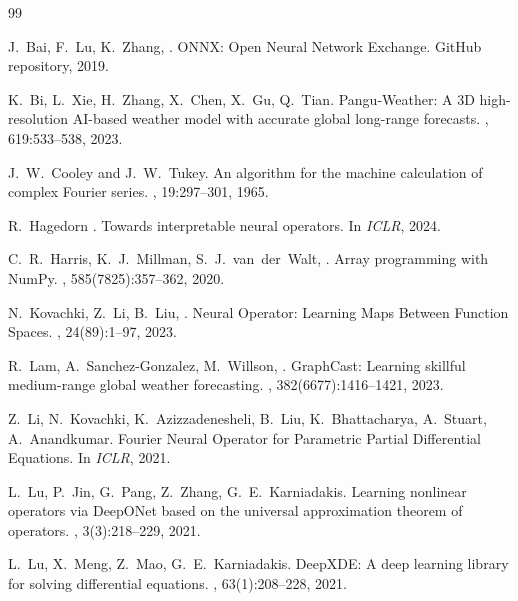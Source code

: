 \documentclass[10pt,twocolumn]{article}
\begin{document}
\begin{thebibliography}{99}\small
\setlength{\itemsep}{2pt}

J.~Bai, F.~Lu, K.~Zhang, \etal.
\newblock ONNX: Open Neural Network Exchange.
\newblock GitHub repository, 2019.

K.~Bi, L.~Xie, H.~Zhang, X.~Chen, X.~Gu, Q.~Tian.
\newblock Pangu-Weather: A 3D high-resolution AI-based weather model
with accurate global long-range forecasts.
, 619:533--538, 2023.

J.~W.~Cooley and J.~W.~Tukey.
\newblock An algorithm for the machine calculation of complex
Fourier series.
, 19:297--301, 1965.

R.~Hagedorn \etal.
\newblock Towards interpretable neural operators.
\newblock In {\em ICLR}, 2024.

C.~R.~Harris, K.~J.~Millman, S.~J.~van~der~Walt, \etal.
\newblock Array programming with NumPy.
, 585(7825):357--362, 2020.

N.~Kovachki, Z.~Li, B.~Liu, \etal.
\newblock Neural Operator: Learning Maps Between Function Spaces.
, 24(89):1--97, 2023.

R.~Lam, A.~Sanchez-Gonzalez, M.~Willson, \etal.
\newblock GraphCast: Learning skillful medium-range global weather
forecasting.
, 382(6677):1416--1421, 2023.

Z.~Li, N.~Kovachki, K.~Azizzadenesheli, B.~Liu, K.~Bhattacharya,
A.~Stuart, A.~Anandkumar.
\newblock Fourier Neural Operator for Parametric Partial
Differential Equations.
\newblock In {\em ICLR}, 2021.

L.~Lu, P.~Jin, G.~Pang, Z.~Zhang, G.~E.~Karniadakis.
\newblock Learning nonlinear operators via DeepONet based on the
universal approximation theorem of operators.
, 3(3):218--229, 2021.

L.~Lu, X.~Meng, Z.~Mao, G.~E.~Karniadakis.
\newblock DeepXDE: A deep learning library for solving
differential equations.
, 63(1):208--228, 2021.


\end{thebibliography}
\end{document}
